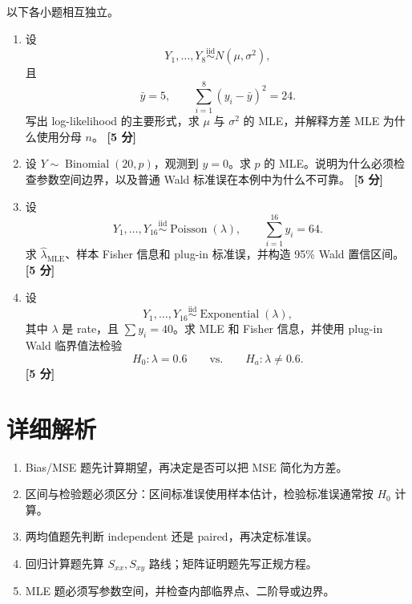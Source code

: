 \documentclass[11pt,a4paper]{article}
\newcommand{\iid}{\overset{\mathrm{iid}}{\sim}}
\newcommand{\pts}[1]{\hfill\textbf{[#1 分]}}
\begin{document}
\begin{questionbox}
以下各小题相互独立。

\begin{enumerate}
  \item 设
  \[
    Y_1,\ldots,Y_8\iid N(\mu,\sigma^2),
  \]
  且
  \[
    \bar y=5,
    \qquad
    \sum_{i=1}^8(y_i-\bar y)^2=24.
  \]
  写出 log-likelihood 的主要形式，求 $\mu$ 与 $\sigma^2$ 的 MLE，并解释方差 MLE 为什么使用分母 $n$。 \pts{5}

  \item 设 $Y\sim\operatorname{Binomial}(20,p)$，观测到 $y=0$。求 $p$ 的 MLE。说明为什么必须检查参数空间边界，以及普通 Wald 标准误在本例中为什么不可靠。 \pts{5}

  \item 设
  \[
    Y_1,\ldots,Y_{16}\iid\operatorname{Poisson}(\lambda),
    \qquad
    \sum_{i=1}^{16}y_i=64.
  \]
  求 $\hat\lambda_{\mathrm{MLE}}$、样本 Fisher 信息和 plug-in 标准误，并构造 95\% Wald 置信区间。 \pts{5}

  \item 设
  \[
    Y_1,\ldots,Y_{16}\iid\operatorname{Exponential}(\lambda),
  \]
  其中 $\lambda$ 是 rate，且 $\sum y_i=40$。求 MLE 和 Fisher 信息，并使用 plug-in Wald 临界值法检验
  \[
    H_0:\lambda=0.6
    \qquad\text{vs.}\qquad
    H_a:\lambda\ne0.6.
  \]
  \pts{5}
\end{enumerate}
\end{questionbox}

\newpage
\section{详细解析}

\begin{checkbox}[本卷主要考查的答题动作]
\begin{enumerate}
  \item Bias/MSE 题先计算期望，再决定是否可以把 MSE 简化为方差。
  \item 区间与检验题必须区分：区间标准误使用样本估计，检验标准误通常按 $H_0$ 计算。
  \item 两均值题先判断 independent 还是 paired，再决定标准误。
  \item 回归计算题先算 $S_{xx},S_{xy}$ 路线；矩阵证明题先写正规方程。
  \item MLE 题必须写参数空间，并检查内部临界点、二阶导或边界。
\end{enumerate}
\end{checkbox}
\end{document}
